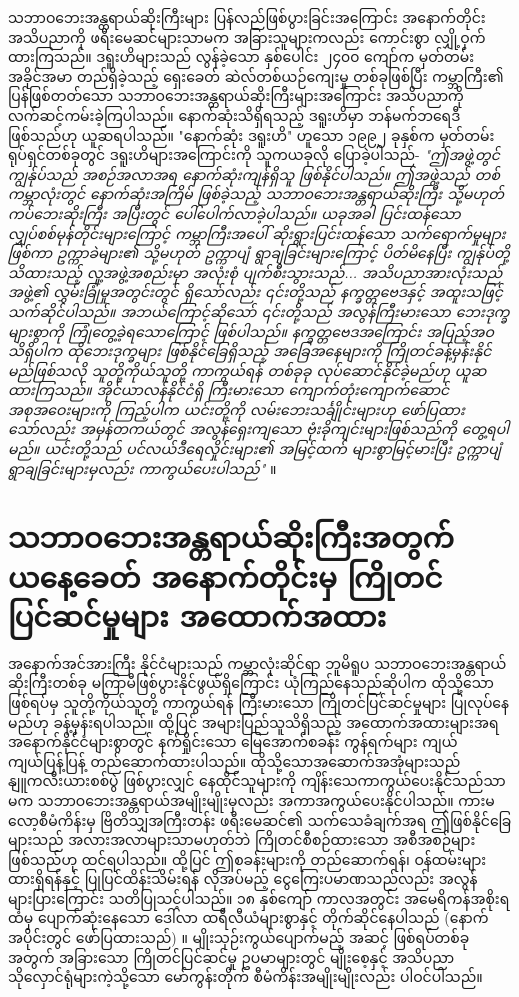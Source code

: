 \documentclass[10pt,twocolumn,letterpaper]{article}
\begin{document}
သဘာဝဘေးအန္တရာယ်ဆိုးကြီးများ ပြန်လည်ဖြစ်ပွားခြင်းအကြောင်း အနောက်တိုင်းအသိပညာကို ဖရီးမေဆင်များသာမက အခြားသူများကလည်း ကောင်းစွာ လျှို့ဝှက်ထားကြသည်။ ဒရူးဟိများသည် လွန်ခဲ့သော နှစ်ပေါင်း ၂၄၀၀ ကျော်က မှတ်တမ်းအခိုင်အမာ တည်ရှိခဲ့သည့် ရှေးခေတ် ဆဲလ်တစ်ယဉ်ကျေးမှု တစ်ခုဖြစ်ပြီး \cite{7} ကမ္ဘာကြီး၏ ပြန်ဖြစ်တတ်သော သဘာဝဘေးအန္တရာယ်ဆိုးကြီးများအကြောင်း အသိပညာကို လက်ဆင့်ကမ်းခဲ့ကြပါသည်။ နောက်ဆုံးသိရှိရသည့် ဒရူးဟိမှာ ဘန်မက်ဘရေဒီဖြစ်သည်ဟု ယူဆရပါသည်။ "နောက်ဆုံး ဒရူးဟိ" ဟူသော ၁၉၉၂ ခုနှစ်က မှတ်တမ်းရုပ်ရှင်တစ်ခုတွင် ဒရူးဟိများအကြောင်းကို သူကယခုလို ပြောခဲ့ပါသည်- \textit{"ဤအဖွဲ့တွင် ကျွန်ုပ်သည် အစဉ်အလာအရ နောက်ဆုံးကျန်ရှိသူ ဖြစ်နိုင်ပါသည်။ ဤအဖွဲ့သည် တစ်ကမ္ဘာလုံးတွင် နောက်ဆုံးအကြိမ် ဖြစ်ခဲ့သည့် သဘာဝဘေးအန္တရာယ်ဆိုးကြီး သို့မဟုတ် ကပ်ဘေးဆိုးကြီး အပြီးတွင် ပေါ်ပေါက်လာခဲ့ပါသည်။ ယခုအခါ ပြင်းထန်သော လျှပ်စစ်မုန်တိုင်းများကြောင့် ကမ္ဘာကြီးအပေါ် ဆိုးရွားပြင်းထန်သော သက်ရောက်မှုများဖြစ်ကာ ဥက္ကာခဲများ၏ သို့မဟုတ် ဥက္ကာပျံ ရွာချခြင်းများကြောင့် ပိတ်မိနေပြီး ကျွန်ုပ်တို့သိထားသည့် လူ့အဖွဲ့အစည်းမှာ အလုံးစုံ ပျက်စီးသွားသည်... အသိပညာအားလုံးသည် အဖွဲ့၏ လွှမ်းခြုံမှုအတွင်းတွင် ရှိသော်လည်း ၎င်းတို့သည် နက္ခတ္တဗေဒနှင့် အထူးသဖြင့် သက်ဆိုင်ပါသည်။ အဘယ်ကြောင့်ဆိုသော် ၎င်းတို့သည် အလွန်ကြီးမားသော ဘေးဒုက္ခများစွာကို ကြုံတွေ့ခဲ့ရသောကြောင့် ဖြစ်ပါသည်။ နက္ခတ္တဗေဒအကြောင်း အပြည့်အဝသိရှိပါက ထိုဘေးဒုက္ခများ ဖြစ်နိုင်ခြေရှိသည့် အခြေအနေများကို ကြိုတင်ခန့်မှန်းနိုင်မည်ဖြစ်သလို သူတို့ကိုယ်သူတို့ ကာကွယ်ရန် တစ်ခုခု လုပ်ဆောင်နိုင်ခဲ့မည်ဟု ယူဆထားကြသည်။ အိုင်ယာလန်နိုင်ငံရှိ ကြီးမားသော ကျောက်တုံးကျောက်ဆောင် အစုအဝေးများကို ကြည့်ပါက ယင်းတို့ကို လမ်းဘေးသင်္ချိုင်းများဟု ဖော်ပြထားသော်လည်း အမှန်တကယ်တွင် အလွန်ရှေးကျသော ဗုံးခိုကျင်းများဖြစ်သည်ကို တွေ့ရပါမည်။ ယင်းတို့သည် ပင်လယ်ဒီရေလှိုင်းများ၏ အမြင့်ထက် များစွာမြင့်မားပြီး ဥက္ကာပျံရွာချခြင်းများမှလည်း ကာကွယ်ပေးပါသည်"} \cite{8,9}။

\section{သဘာဝဘေးအန္တရာယ်ဆိုးကြီးအတွက် ယနေ့ခေတ် အနောက်တိုင်းမှ ကြိုတင်ပြင်ဆင်မှုများ အထောက်အထား}

အနောက်အင်အားကြီး နိုင်ငံများသည် ကမ္ဘာလုံးဆိုင်ရာ ဘူမိရူပ သဘာဝဘေးအန္တရာယ်ဆိုးကြီးတစ်ခု မကြာမီဖြစ်ပွားနိုင်ဖွယ်ရှိကြောင်း ယုံကြည်နေသည်ဆိုပါက ထိုသို့သောဖြစ်ရပ်မှ သူတို့ကိုယ်သူတို့ ကာကွယ်ရန် ကြီးမားသော ကြိုတင်ပြင်ဆင်မှုများ ပြုလုပ်နေမည်ဟု ခန့်မှန်းရပါသည်။ ထို့ပြင် အများပြည်သူသိရှိသည့် အထောက်အထားများအရ အနောက်နိုင်ငံများစွာတွင် နက်ရှိုင်းသော မြေအောက်စခန်း ကွန်ရက်များ ကျယ်ကျယ်ပြန့်ပြန့် တည်ဆောက်ထားပါသည်။ ထိုသို့သောအဆောက်အအုံများသည် နျူကလီးယားစစ်ပွဲ ဖြစ်ပွားလျှင် နေထိုင်သူများကို ကျိန်းသေကာကွယ်ပေးနိုင်သည်သာမက သဘာဝဘေးအန္တရာယ်အမျိုးမျိုးမှလည်း အကာအကွယ်ပေးနိုင်ပါသည်။ ကားမလော့စီမံကိန်းမှ ဗြိတိသျှအကြီးတန်း ဖရီးမေဆင်၏ သက်သေခံချက်အရ \cite{4,6} ဤဖြစ်နိုင်ခြေများသည် အလားအလာများသာမဟုတ်ဘဲ ကြိုတင်စီစဉ်ထားသော အစီအစဉ်များ ဖြစ်သည်ဟု ထင်ရပါသည်။ ထို့ပြင် ဤစခန်းများကို တည်ဆောက်ရန်၊ ဝန်ထမ်းများထားရှိရန်နှင့် ပြုပြင်ထိန်းသိမ်းရန် လိုအပ်မည့် ငွေကြေးပမာဏသည်လည်း အလွန်များပြားကြောင်း သတိပြုသင့်ပါသည်။ ၁၈ နှစ်ကျော် ကာလအတွင်း အမေရိကန်အစိုးရထံမှ ပျောက်ဆုံးနေသော ဒေါ်လာ ထရီလီယံများစွာနှင့် တိုက်ဆိုင်နေပါသည် (နောက်အပိုင်းတွင် ဖော်ပြထားသည်) \cite{11,12,13}။ မျိုးသုဉ်းကွယ်ပျောက်မည့် အဆင့် ဖြစ်ရပ်တစ်ခုအတွက် အခြားသော ကြိုတင်ပြင်ဆင်မှု ဥပမာများတွင် မျိုးစေ့နှင့် အသိပညာ သိုလှောင်ရုံများကဲ့သို့သော မော်ကွန်းတိုက် စီမံကိန်းအမျိုးမျိုးလည်း ပါဝင်ပါသည်။
\end{document}
